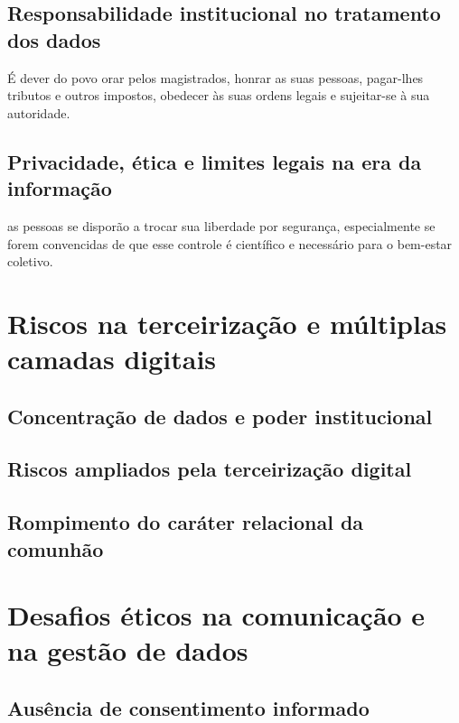 \subsection{Responsabilidade institucional no tratamento dos dados}

\begin{citacao}
É dever do povo orar pelos magistrados, honrar as suas pessoas, pagar-lhes tributos e outros impostos, obedecer às suas ordens legais e sujeitar-se à sua autoridade. \cite[Cap. XXIII]{cfw}
\end{citacao}

\subsection{Privacidade, ética e limites legais na era da informação}

\begin{citacao}
as pessoas se disporão a trocar sua liberdade por segurança, especialmente se forem convencidas de que esse controle é científico e necessário para o bem-estar coletivo. \cite[p. 165]{schaeffer2002}
\end{citacao}

\section{Riscos na terceirização e múltiplas camadas digitais}

\subsection{Concentração de dados e poder institucional}

\subsection{Riscos ampliados pela terceirização digital}

\subsection{Rompimento do caráter relacional da comunhão}

\section{Desafios éticos na comunicação e na gestão de dados}

\subsection{Ausência de consentimento informado}

